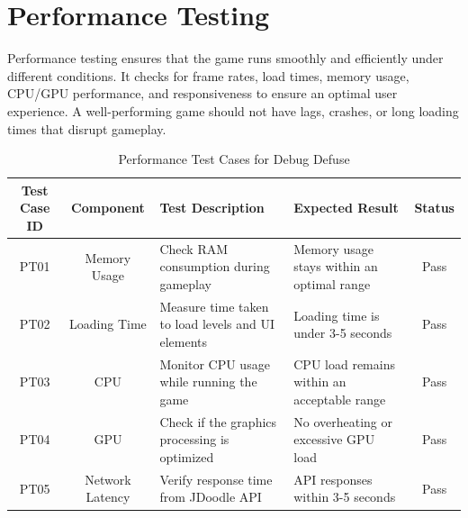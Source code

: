 \section{Performance Testing}
Performance testing ensures that the game runs smoothly and efficiently under different conditions. It checks for frame rates, load times, memory usage, CPU/GPU performance, and responsiveness to ensure an optimal user experience. A well-performing game should not have lags, crashes, or long loading times that disrupt gameplay.\\
\begin{table}[H]
    \centering
    \renewcommand{\arraystretch}{1.3}
    \begin{tabular}{|c|c|p{4cm}|p{3cm}|c|}
        \hline
        \textbf{Test Case ID} & \textbf{Component} & \textbf{Test Description} & \textbf{Expected Result} & \textbf{Status} \\
        \hline
        PT01 & Memory Usage & Check RAM consumption during gameplay & Memory usage stays within an optimal range & Pass \\
        \hline
        PT02 & Loading Time & Measure time taken to load levels and UI elements & Loading time is under 3-5 seconds & Pass \\
        \hline
        PT03 & CPU & Monitor CPU usage while running the game & CPU load remains within an acceptable range & Pass \\
        \hline
        PT04 & GPU & Check if the graphics processing is optimized & No overheating or excessive GPU load & Pass \\
        \hline
        PT05 & Network Latency & Verify response time from JDoodle API & API responses within 3-5 seconds & Pass \\
        \hline
    \end{tabular}
    \caption{Performance Test Cases for Debug Defuse}
    \label{tab:performance_tests}
\end{table}

